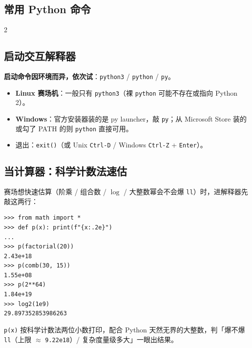 	\begin{center}
		\section{常用 Python 命令}
	\end{center}

\begin{multicols*}{2}

	\subsection{启动交互解释器}

	\textbf{启动命令因环境而异，依次试}：\texttt{python3} / \texttt{python} / \texttt{py}。

	\begin{itemize}
		\item \textbf{Linux 赛场机}：一般只有 \texttt{python3}（裸 \texttt{python} 可能不存在或指向 Python 2）。
		\item \textbf{Windows}：官方安装器装的是 py launcher，敲 \texttt{py}；从 Microsoft Store 装的或勾了 PATH 的则 \texttt{python} 直接可用。
		\item 退出：\texttt{exit()}（或 Unix \texttt{Ctrl-D} / Windows \texttt{Ctrl-Z} + \texttt{Enter}）。
	\end{itemize}

	\subsection{当计算器：科学计数法速估}

	赛场想快速估算（阶乘 / 组合数 / $\log$ / 大整数幂会不会爆 \texttt{ll}）时，进解释器先敲这两行：

	\begin{verbatim}
>>> from math import *
>>> def p(x): print(f"{x:.2e}")
...
>>> p(factorial(20))
2.43e+18
>>> p(comb(30, 15))
1.55e+08
>>> p(2**64)
1.84e+19
>>> log2(1e9)
29.897352853986263
	\end{verbatim}

	\texttt{p(x)} 按科学计数法两位小数打印，配合 Python 天然无界的大整数，判「爆不爆 \texttt{ll}（上限 $\approx$ \texttt{9.22e18}）/ 复杂度量级多大」一眼出结果。

\end{multicols*}
